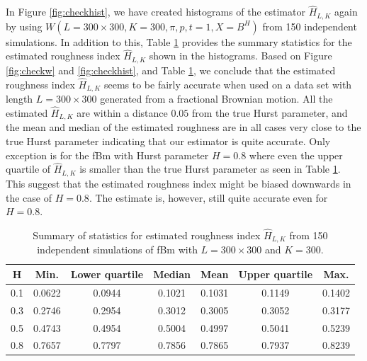 \documentclass{article}
\begin{document}
In Figure \ref{fig:checkhist}, we have created histograms of the estimator $\hat{H}_{L,K}$ again by using $W(L=300\times 300, K=300, \pi, p, t=1, X=B^H)$ from 150 independent simulations. In addition to this, Table \ref{tab:checkhist} provides the summary statistics for the estimated roughness index $\hat{H}_{L,K}$ shown in the histograms. Based on Figure \ref{fig:checkw} and \ref{fig:checkhist}, and Table \ref{tab:checkhist}, we conclude that the estimated roughness index $\hat{H}_{L,K}$ seems to be fairly accurate when used on a data set with length $L=300\times 300$ generated from a fractional Brownian motion. All the estimated  $\hat{H}_{L,K}$ are within a distance $0.05$ from the true Hurst parameter, and the mean and median of the estimated roughness are in all cases very close to the true Hurst parameter indicating that our estimator is quite accurate. Only exception is for the fBm with Hurst parameter $H=0.8$ where even the upper quartile of $\hat{H}_{L,K}$ is smaller than the true Hurst parameter as seen in Table \ref{tab:checkhist}. This suggest that the estimated roughness index might be biased downwards in the case of $H=0.8$. The estimate is, however, still quite accurate even for $H=0.8$.
\begin{table}[htbp]
    \centering
    \begin{tabular}{ccccccc}
        \toprule
        H & Min. & Lower quartile & Median & Mean & Upper quartile & Max. \\
        \midrule
        0.1 & 0.0622 & 0.0944 & 0.1021 & 0.1031 & 0.1149 & 0.1402 \\
        0.3 & 0.2746 & 0.2954 & 0.3012 & 0.3005 & 0.3052 & 0.3177 \\
        0.5 & 0.4743 & 0.4954 & 0.5004 & 0.4997 & 0.5041 & 0.5239 \\
        0.8 & 0.7657 & 0.7797 & 0.7856 & 0.7865 & 0.7937 & 0.8239 \\
        \bottomrule
    \end{tabular}
    \caption{Summary of statistics for estimated roughness index $\hat{H}_{L,K}$ from 150 independent simulations of fBm with $L=300\times 300$ and $K=300$.}
    \label{tab:checkhist}
\end{table}
\end{document}
